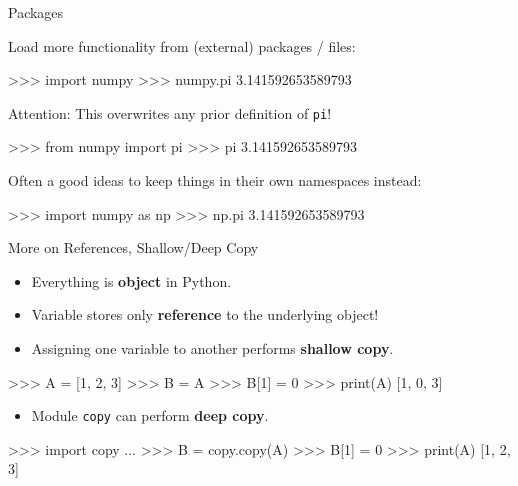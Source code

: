\documentclass[10pt]{beamer}
\begin{document}
\begin{frame}[fragile]{Packages}

    Load more functionality from (external) packages / files:

    \begin{pythoncode}
        >>> import numpy
        >>> numpy.pi
        3.141592653589793
    \end{pythoncode}

    \pause

    Attention: This overwrites any prior definition of \texttt{pi}!
    \begin{pythoncode}
        >>> from numpy import pi
        >>> pi
        3.141592653589793
    \end{pythoncode}

    \pause

    Often a good ideas to keep things in their own namespaces instead:
    \begin{pythoncode}
        >>> import numpy as np
        >>> np.pi
        3.141592653589793
    \end{pythoncode}

\end{frame}

\begin{frame}[fragile]{More on References, Shallow/Deep Copy}
	
	\begin{itemize}
		\item \pause Everything is \textbf{object} in Python.
		\item \pause Variable stores only \textbf{reference} to the underlying object!
		\item \pause Assigning one variable to another performs \textbf{shallow copy}.
	\end{itemize}
	
	\pause
	\begin{pythoncode}
		>>> A = [1, 2, 3]
		>>> B = A
		>>> B[1] = 0
		>>> print(A)
		[1, 0, 3]
	\end{pythoncode}
	
	\begin{itemize}
		\item \pause Module \small{\texttt{copy}} can perform \textbf{deep copy}.
	\end{itemize}
	\begin{pythoncode}
		>>> import copy
		...
		>>> B = copy.copy(A)
		>>> B[1] = 0
		>>> print(A)
		[1, 2, 3]
	\end{pythoncode}
\end{frame}
\end{document}
